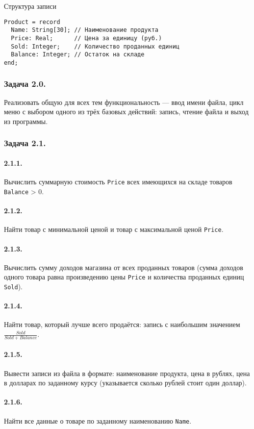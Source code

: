 \documentclass[12pt,a4paper]{report}
\begin{document}
Структура записи
\begin{verbatim}
Product = record
  Name: String[30]; // Наименование продукта
  Price: Real;      // Цена за единицу (руб.)
  Sold: Integer;    // Количество проданных единиц
  Balance: Integer; // Остаток на складе
end;
\end{verbatim}

\subsubsection{Задача 2.0.} Реализовать общую для всех тем функциональность --- ввод имени файла, цикл меню с выбором одного из трёх базовых действий: запись, чтение файла и выход из программы.

\subsubsection{Задача 2.1.}
\paragraph{2.1.1.} Вычислить суммарную стоимость \texttt{Price} всех имеющихся на складе товаров \texttt{Balance} > 0.
\paragraph{2.1.2.} Найти товар с минимальной ценой и товар с максимальной ценой \texttt{Price}.
\paragraph{2.1.3.} Вычислить сумму доходов магазина от всех проданных товаров (сумма доходов одного товара равна произведению цены \texttt{Price} и количества проданных единиц \texttt{Sold}).
\paragraph{2.1.4.} Найти товар, который лучше всего продаётся: запись с наибольшим значением $\frac { Sold } { Sold + Balance } $.
\paragraph{2.1.5.} Вывести записи из файла в формате: наименование продукта, цена в рублях, цена в долларах по заданному курсу (указывается сколько рублей стоит один доллар).
\paragraph{2.1.6.} Найти все данные о товаре по заданному наименованию \texttt{Name}.
\end{document}
